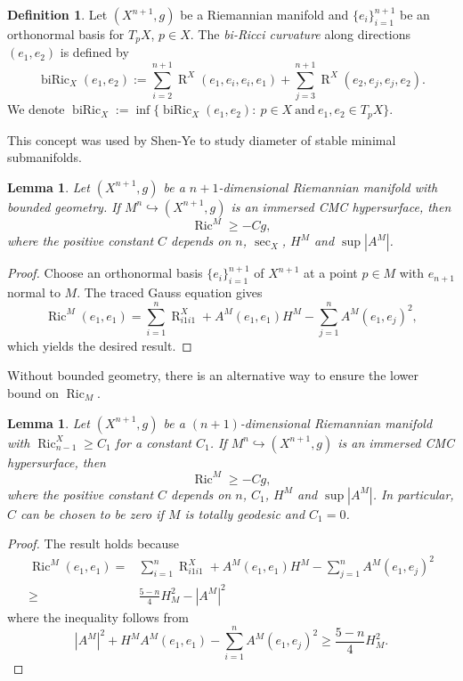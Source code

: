 \documentclass[11pt,letterpaper]{amsart}
\DeclareMathOperator{\Ric}{Ric}
\DeclareMathOperator{\biRic}{biRic}
\DeclareMathOperator{\R}{R}
\newtheorem{lemma}[theorem]{Lemma}
\theoremstyle{definition}
\newtheorem{definition}[theorem]{Definition}
\theoremstyle{remark}
\numberwithin{equation}{section}
\begin{document}
\begin{definition}\label{biRicci}
    Let $(X^{n+1},g)$ be a Riemannian manifold and $\{e_i\}_{i=1}^{n+1}$ be an orthonormal basis for $T_pX$, $p\in X$. The \textit{bi-Ricci curvature} along directions $(e_1,e_2)$ is defined by
    \begin{equation*}
        \biRic_X(e_1,e_2):=\sum_{i=2}^{n+1}\R^X(e_1,e_i,e_i,e_1)+\sum_{j=3}^{n+1}\R^X(e_2,e_j,e_j,e_2).
    \end{equation*}
   We denote $\biRic_X:=\inf\{\biRic_X(e_1,e_2):\ p\in X\ \text{and}\ e_1, e_2\in T_pX\}.$
\end{definition}
This concept was used by Shen-Ye \cite{shenyingyerugang} to study diameter of stable minimal submanifolds.
\begin{lemma}\label{Ric-lower}
    Let $(X^{n+1},g)$ be a $n+1$-dimensional Riemannian manifold with bounded geometry. If $M^n\hookrightarrow (X^{n+1},g)$ is an immersed CMC hypersurface, then
    \begin{equation*}
        \Ric^M\geqslant -Cg,
    \end{equation*}
    where the positive constant $C$ depends on $n$, $\sec_X$, $H^M$ and $\sup |A^M|$.
\end{lemma}
\begin{proof}
    Choose an orthonormal basis $\{e_i\}_{i=1}^{n+1}$ of $X^{n+1}$ at a point $p\in M$ with $e_{n+1}$ normal to $M$. The traced Gauss equation gives
    \begin{equation*}
        \Ric^M(e_1,e_1)=\sum_{i=1}^{n} \R^X_{i1i1}+A^M(e_1,e_1)H^M-\sum_{j=1}^{n}A^M(e_1,e_j)^2,
    \end{equation*}
    which yields the desired result.
\end{proof}

Without bounded geometry, there is an alternative way to ensure the lower bound on $\Ric_M$.
\begin{lemma}\label{Ric-lower1}
    Let $(X^{n+1},g)$ be a $(n+1)$-dimensional Riemannian manifold with $\Ric^X_{n-1}\geq C_1$ for a constant $C_1$. If $M^n\hookrightarrow (X^{n+1},g)$ is an immersed CMC hypersurface, then
    \begin{equation*}
        \Ric^M\geqslant -Cg,
    \end{equation*}
    where the positive constant $C$ depends on $n$, $C_1$, $H^M$ and $\sup|A^M|$. In particular, $C$ can be chosen to be zero if $M$ is totally geodesic and $C_1=0$.
\end{lemma}
\begin{proof}
    The result holds because
    \begin{align*}
        \Ric^M(e_1,e_1)=&\sum_{i=1}^{n} \R^X_{i1i1}+A^M(e_1,e_1)H^M-\sum_{j=1}^{n}A^M(e_1,e_j)^2\\
        \geq & \frac{5-n}{4}H_M^2-|A^M|^2
    \end{align*}
    where the inequality follows from $$|A^M|^2+H^M A^M(e_1,e_1)-\sum_{i=1}^nA^M(e_1,e_j)^2\geq \frac{5-n}{4}H_M^2.$$
        
\end{proof}
\end{document}
